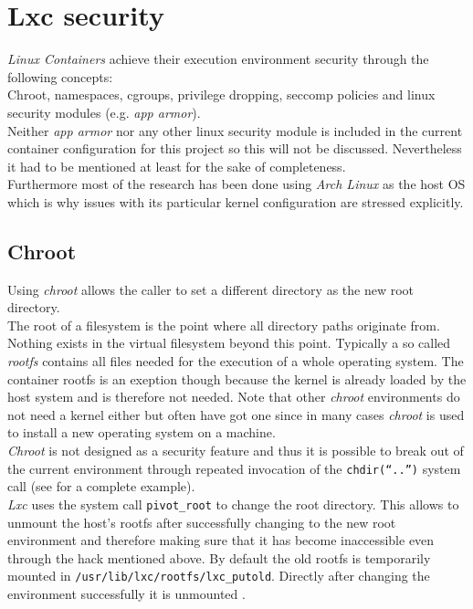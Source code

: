 \chapter{Lxc security}\label{features}

\textit{Linux Containers} achieve their execution environment security through the following concepts:\\
Chroot, namespaces, cgroups, privilege dropping, seccomp policies and linux security modules (e.g. \textit{app armor}).\\
Neither \textit{app armor} nor any other linux security module is included in the current container configuration for this project
so this will not be discussed. Nevertheless it had to be mentioned at least for the sake of completeness.\\
Furthermore most of the research has been done using \textit{Arch Linux} as the host OS which is why issues with its particular
kernel configuration are stressed explicitly.

\section{Chroot}\label{rootfs}

Using \textit{chroot} allows the caller to set a different directory as the new root directory.\\
The root of a filesystem is the point where all directory paths originate from.
Nothing exists in the virtual filesystem beyond this point. Typically a so called \textit{rootfs} contains all files needed for
the execution of a whole operating system.
The container rootfs is an exeption though because the kernel is already loaded by
the host system and is therefore not needed. Note that other \textit{chroot} environments do not need a kernel either but often have got one
since in many cases \textit{chroot} is used to install a new operating system on a machine.\\
\textit{Chroot} is not designed as a security feature and thus it is possible to break out of the current environment through
repeated invocation of the \texttt{chdir(``..'')} system call (see \cite{chrootbreak} for a complete example).\\
\textit{Lxc} uses the system call \texttt{pivot\_root} to change the root directory. This allows to unmount the host's rootfs after
successfully changing to the new root environment and therefore making sure that it has become inaccessible even through the hack
mentioned above.
By default the old rootfs is temporarily mounted in \texttt{/usr/lib/lxc/rootfs/lxc\_putold}. Directly after changing the environment successfully
it is unmounted \cite{pivotsetup}.

